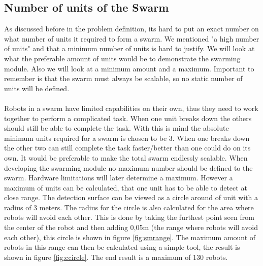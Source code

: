 \documentclass[10pt,a4paper]{article}
\begin{document}
\begin{table}[h]
\centering
{}
\caption{Localisation specification}
\label{smrange}
\end{table}



\subsection{Number of units of the Swarm}
As discussed before in the problem definition, its hard to put an exact number on what number of units it required to form a swarm. We mentioned "a high number of units" and that a minimum number of units is hard to justify. We will look at what the preferable amount of units would be to demonstrate the swarming module. Also we will look at a minimum amount and a maximum. Important to remember is that the swarm must always be scalable, so no static number of units will be defined.\\\\Robots in a swarm have limited capabilities on their own, thus they need to work together to perform a complicated task. When one unit breaks down the others should still be able to complete the task. With this is mind the absolute minimum units required for a swarm is chosen to be 3. When one breaks down the other two can still complete the task faster/better than one could do on its own. It would be preferable to make the total swarm endlessly scalable. When developing the swarming module no maximum number should be defined to the swarm. Hardware limitations will later determine a maximum. However a maximum of units can be calculated, that one unit has to be able to detect at close range. The detection surface can be viewed as a circle around of unit with a radius of 3 meters. The radius for the  circle is also calculated for the area where robots will avoid each other. This is done by taking the furthest point seen from the center of the robot and then adding 0,05m (the range where robots will avoid each other), this circle is shown in figure \ref{fig:smrange}. The maximum amount of robots in this range can then be calculated using a simple tool, the result is shown in figure \ref{fig:ccircle}. The end result is a maximum of 130 robots.
\end{document}
